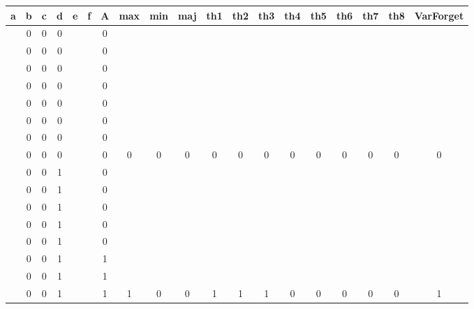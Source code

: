 \begin{table}[!tb]
    \centering
    \begin{tabular}{|c|c|c|c|c|c|c|c|c|c|c|c|c|c|c|c|c|c|c|}
        \hline
        \textbf{a} & \textbf{b} & \textbf{c} & \textbf{d} & \textbf{e} & \textbf{f} & \textbf{A} & \textbf{max} & \textbf{min} & \textbf{maj} & \textbf{th1} & \textbf{th2} & \textbf{th3} & \textbf{th4} & \textbf{th5} & \textbf{th6} & \textbf{th7} & \textbf{th8} & \textbf{VarForget} \\ \hline
        \rowcolor{gray!40}  & 0 & 0 & 0 &  &  & 0 &  &  &  &  &  &  &  &  &  &  &  &  \\ \hline
        \rowcolor{gray!40}  & 0 & 0 & 0 &  &  & 0 &  &  &  &  &  &  &  &  &  &  &  &  \\ \hline
        \rowcolor{gray!40}  & 0 & 0 & 0 &  &  & 0 &  &  &  &  &  &  &  &  &  &  &  &  \\ \hline
        \rowcolor{gray!40}  & 0 & 0 & 0 &  &  & 0 &  &  &  &  &  &  &  &  &  &  &  &  \\ \hline
        \rowcolor{gray!40}  & 0 & 0 & 0 &  &  & 0 &  &  &  &  &  &  &  &  &  &  &  &  \\ \hline
        \rowcolor{gray!40}  & 0 & 0 & 0 &  &  & 0 &  &  &  &  &  &  &  &  &  &  &  &  \\ \hline
        \rowcolor{gray!40}  & 0 & 0 & 0 &  &  & 0 &  &  &  &  &  &  &  &  &  &  &  &  \\ \hline
        \rowcolor{gray!40}  & 0 & 0 & 0 &  &  & 0 & 0 & 0 & 0 & 0 & 0 & 0 & 0 & 0 & 0 & 0 & 0 & 0 \\ \hline
        \rowcolor{blue!40}  & 0 & 0 & 1 &  &  & 0 &  &  &  &  &  &  &  &  &  &  &  &  \\ \hline
        \rowcolor{blue!40}  & 0 & 0 & 1 &  &  & 0 &  &  &  &  &  &  &  &  &  &  &  &  \\ \hline
        \rowcolor{blue!40}  & 0 & 0 & 1 &  &  & 0 &  &  &  &  &  &  &  &  &  &  &  &  \\ \hline
        \rowcolor{blue!40}  & 0 & 0 & 1 &  &  & 0 &  &  &  &  &  &  &  &  &  &  &  &  \\ \hline
        \rowcolor{blue!40}  & 0 & 0 & 1 &  &  & 0 &  &  &  &  &  &  &  &  &  &  &  &  \\ \hline
        \rowcolor{blue!40}  & 0 & 0 & 1 &  &  & 1 &  &  &  &  &  &  &  &  &  &  &  &  \\ \hline
        \rowcolor{blue!40}  & 0 & 0 & 1 &  &  & 1 &  &  &  &  &  &  &  &  &  &  &  &  \\ \hline
        \rowcolor{blue!40}  & 0 & 0 & 1 &  &  & 1 & 1 & 0 & 0 & 1 & 1 & 1 & 0 & 0 & 0 & 0 & 0 & 1 \\ \hline

\end{tabular}
\end{table}

